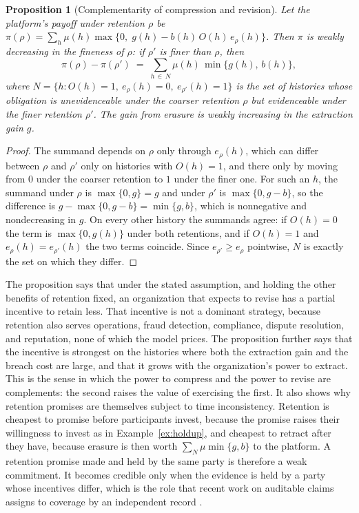 \documentclass[11pt]{article}
\newtheorem{proposition}{Proposition}
\theoremstyle{definition}
\theoremstyle{remark}
\begin{document}
\begin{proposition}[Complementarity of compression and revision]\label{prop:complement}
Let the platform's payoff under retention $\rho$ be $\pi(\rho)=\sum_h\mu(h)\max\{0,\;g(h)-b(h)\,O(h)\,e_\rho(h)\}$. Then $\pi$ is weakly decreasing in the fineness of $\rho$: if $\rho'$ is finer than $\rho$, then
\[
\pi(\rho)-\pi(\rho')\;=\;\sum_{h\,\in\,N}\mu(h)\,\min\{g(h),\,b(h)\},
\]
where $N=\{h: O(h)=1,\ e_\rho(h)=0,\ e_{\rho'}(h)=1\}$ is the set of histories whose obligation is unevidenceable under the coarser retention $\rho$ but evidenceable under the finer retention $\rho'$. The gain from erasure is weakly increasing in the extraction gain $g$.
\end{proposition}

\begin{proof}
The summand depends on $\rho$ only through $e_\rho(h)$, which can differ between $\rho$ and $\rho'$ only on histories with $O(h)=1$, and there only by moving from $0$ under the coarser retention to $1$ under the finer one. For such an $h$, the summand under $\rho$ is $\max\{0,g\}=g$ and under $\rho'$ is $\max\{0,g-b\}$, so the difference is $g-\max\{0,g-b\}=\min\{g,b\}$, which is nonnegative and nondecreasing in $g$. On every other history the summands agree: if $O(h)=0$ the term is $\max\{0,g(h)\}$ under both retentions, and if $O(h)=1$ and $e_\rho(h)=e_{\rho'}(h)$ the two terms coincide. Since $e_{\rho'}\ge e_\rho$ pointwise, $N$ is exactly the set on which they differ.
\end{proof}

The proposition says that under the stated assumption, and holding the other benefits of retention fixed, an organization that expects to revise has a partial incentive to retain less. That incentive is not a dominant strategy, because retention also serves operations, fraud detection, compliance, dispute resolution, and reputation, none of which the model prices. The proposition further says that the incentive is strongest on the histories where both the extraction gain and the breach cost are large, and that it grows with the organization's power to extract. This is the sense in which the power to compress and the power to revise are complements: the second raises the value of exercising the first. It also shows why retention promises are themselves subject to time inconsistency. Retention is cheapest to promise before participants invest, because the promise raises their willingness to invest as in Example~\ref{ex:holdup}, and cheapest to retract after they have, because erasure is then worth $\sum_N\mu\min\{g,b\}$ to the platform. A retention promise made and held by the same party is therefore a weak commitment. It becomes credible only when the evidence is held by a party whose incentives differ, which is the role that recent work on auditable claims assigns to coverage by an independent record \cite{auditable}.
\end{document}

